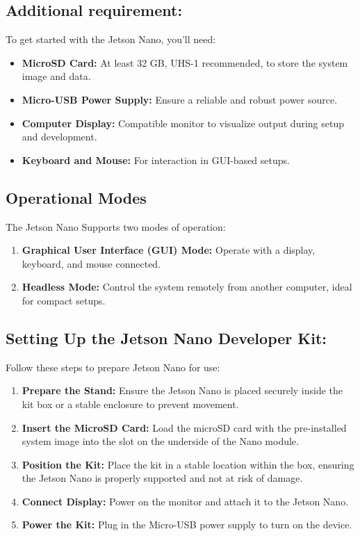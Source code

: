 \subsection{Additional requirement:}
To get started with the Jetson Nano, you’ll need:
\begin{itemize}
	\item \textbf{MicroSD Card:} At least 32 GB, UHS-1 recommended, to store the system image and data.
	\item\textbf{Micro-USB Power Supply:} Ensure a reliable and robust power source. 
	\item \textbf{Computer Display:} Compatible monitor to visualize output during setup and development.
	\item \textbf{Keyboard and Mouse:} For interaction in GUI-based setups.
\end{itemize}


\subsection{Operational Modes}
The Jetson Nano Supports two modes of operation:
\begin{enumerate}
	\item \textbf{Graphical User Interface (GUI) Mode:} Operate with a display, keyboard, and mouse connected.
	\item\textbf{Headless Mode:} Control the system remotely from another computer, ideal for compact setups.
\end{enumerate}

\subsection{Setting Up the Jetson Nano Developer Kit:}
Follow these steps to prepare Jetson Nano for use:
\begin{enumerate}
	\item \textbf{Prepare the Stand:} Ensure the Jetson Nano is placed securely inside the kit box or a stable enclosure to prevent movement.
	\item \textbf{Insert the MicroSD Card:} Load the microSD card with the pre-installed system image into the slot on the underside of the Nano module.
	\item \textbf{Position the Kit:} Place the kit in a stable location within the box, ensuring the Jetson Nano is properly supported and not at risk of damage.
	\item \textbf{Connect Display:} Power on the monitor and attach it to the Jetson Nano.
	\item \textbf{Power the Kit:} Plug in the Micro-USB power supply to turn on the device.  \cite{JET:2024}
\end{enumerate}


